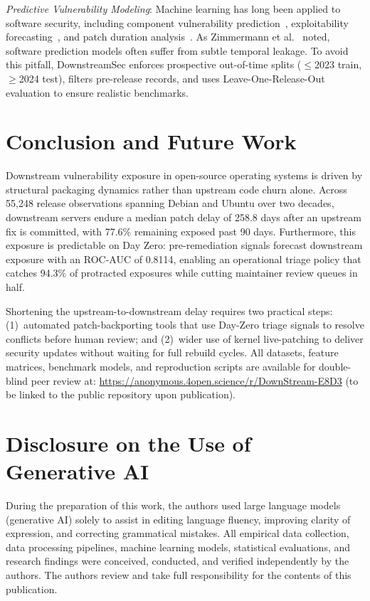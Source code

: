 \documentclass[graybox]{svmult}
\begin{document}
\textit{Predictive Vulnerability Modeling}: Machine learning has long been applied to software security, including component vulnerability prediction~\cite{scandariato2014predicting}, exploitability forecasting~\cite{freitas2021predicting}, and patch duration analysis~\cite{saha2018understanding}. As Zimmermann et al.~\cite{zimmermann2010predicting} noted, software prediction models often suffer from subtle temporal leakage. To avoid this pitfall, DownstreamSec enforces prospective out-of-time splits ($\le$2023 train, $\ge$2024 test), filters pre-release records, and uses Leave-One-Release-Out evaluation to ensure realistic benchmarks.

\section{Conclusion and Future Work}
\label{sec:conclusion}

Downstream vulnerability exposure in open-source operating systems is driven by structural packaging dynamics rather than upstream code churn alone. Across 55,248 release observations spanning Debian and Ubuntu over two decades, downstream servers endure a median patch delay of 258.8 days after an upstream fix is committed, with 77.6\% remaining exposed past 90 days. Furthermore, this exposure is predictable on Day Zero: pre-remediation signals forecast downstream exposure with an ROC-AUC of 0.8114, enabling an operational triage policy that catches 94.3\% of protracted exposures while cutting maintainer review queues in half.

Shortening the upstream-to-downstream delay requires two practical steps: (1)~automated patch-backporting tools that use Day-Zero triage signals to resolve conflicts before human review; and (2)~wider use of kernel live-patching to deliver security updates without waiting for full rebuild cycles. All datasets, feature matrices, benchmark models, and reproduction scripts are available for double-blind peer review at: \url{https://anonymous.4open.science/r/DownStream-E8D3} (to be linked to the public repository upon publication).

\section*{Disclosure on the Use of Generative AI}
During the preparation of this work, the authors used large language models (generative AI) solely to assist in editing language fluency, improving clarity of expression, and correcting grammatical mistakes. All empirical data collection, data processing pipelines, machine learning models, statistical evaluations, and research findings were conceived, conducted, and verified independently by the authors. The authors review and take full responsibility for the contents of this publication.
\end{document}
